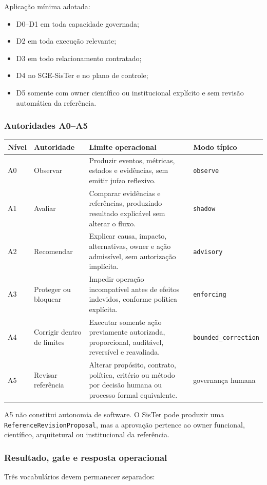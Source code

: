 \documentclass[11pt,a4paper,oneside]{article}
\begin{document}
Aplicação mínima adotada:
\begin{itemize}
  \item D0--D1 em toda capacidade governada;
  \item D2 em toda execução relevante;
  \item D3 em todo relacionamento contratado;
  \item D4 no SGE-SisTer e no plano de controle;
  \item D5 somente com owner científico ou institucional explícito e sem revisão automática da referência.
\end{itemize}

\subsubsection{Autoridades A0--A5}
\begin{longtable}{P{1.5cm}P{3.7cm}P{7.0cm}P{2.8cm}}
\toprule
\textbf{Nível} & \textbf{Autoridade} & \textbf{Limite operacional} & \textbf{Modo típico} \\
\midrule
\endhead
A0 & Observar & Produzir eventos, métricas, estados e evidências, sem emitir juízo reflexivo. & \texttt{observe} \\
A1 & Avaliar & Comparar evidências e referências, produzindo resultado explicável sem alterar o fluxo. & \texttt{shadow} \\
A2 & Recomendar & Explicar causa, impacto, alternativas, owner e ação admissível, sem autorização implícita. & \texttt{advisory} \\
A3 & Proteger ou bloquear & Impedir operação incompatível antes de efeitos indevidos, conforme política explícita. & \texttt{enforcing} \\
A4 & Corrigir dentro de limites & Executar somente ação previamente autorizada, proporcional, auditável, reversível e reavaliada. & \texttt{bounded\_correction} \\
A5 & Revisar referência & Alterar propósito, contrato, política, critério ou método por decisão humana ou processo formal equivalente. & governança humana \\
\bottomrule
\end{longtable}

A5 não constitui autonomia de software. O SisTer pode produzir uma \texttt{ReferenceRevisionProposal}, mas a aprovação pertence ao owner funcional, científico, arquitetural ou institucional da referência.

\subsubsection{Resultado, gate e resposta operacional}
Três vocabulários devem permanecer separados:
\end{document}
